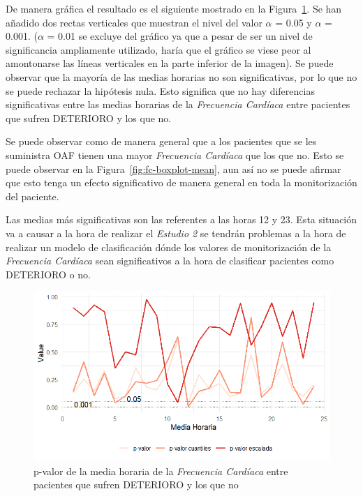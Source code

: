 De manera gráfica el resultado es el siguiente mostrado en la Figura~\ref{fig:mean-FC}. Se han añadido dos rectas verticales que muestran el nivel del valor $\alpha$ = 0.05 y $\alpha$ = 0.001. ($\alpha$ = 0.01 se excluye del gráfico ya que a pesar de ser un nivel de significancia ampliamente utilizado, haría que el gráfico se viese peor al amontonarse las líneas verticales en la parte inferior de la imagen). Se puede observar que la mayoría de las medias horarias no son significativas, por lo que no se puede rechazar la hipótesis nula. Esto significa que no hay diferencias significativas entre las medias horarias de la \textit{Frecuencia Cardíaca} entre pacientes que sufren DETERIORO y los que no.

Se puede observar como de manera general que a los pacientes que se les suministra OAF tienen una mayor \textit{Frecuencia Cardíaca} que los que no. Esto se puede observar en la Figura~\ref{fig:fc-boxplot-mean}, aun así no se puede afirmar que esto tenga un efecto significativo de manera general en toda la monitorización del paciente.

Las medias más significativas son las referentes a las horas 12 y 23. Esta situación va a causar a la hora de realizar el \textit{Estudio 2} se tendrán problemas a la hora de realizar un modelo de clasificación dónde los valores de monitorización de la \textit{Frecuencia Cardíaca} sean significativos a la hora de clasificar pacientes como DETERIORO o no.

\begin{figure}[H]
    \centering
    \includegraphics[scale = 1]{./img/mean-FC.png}
    \caption{p-valor de la media horaria de la \textit{Frecuencia Cardíaca} entre pacientes que sufren DETERIORO y los que no}
    \label{fig:mean-FC}
\end{figure}

